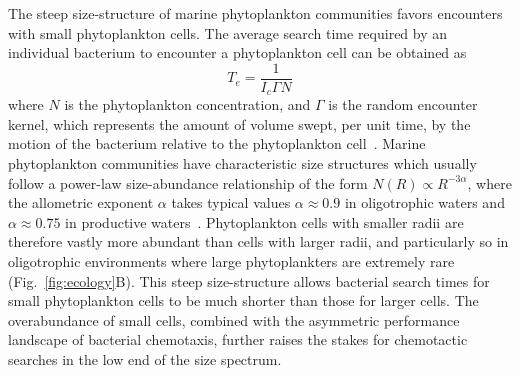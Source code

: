\documentclass[9pt,twocolumn,twoside]{pnas-new}
\begin{document}
The steep size-structure of marine phytoplankton communities favors encounters with small phytoplankton cells.
The average search time required by an individual bacterium to encounter a phytoplankton cell can be obtained as
\begin{equation}\label{eq:search_time}
    T_e = \dfrac{1}{I_c \Gamma N}
\end{equation}
where $N$ is the phytoplankton concentration, and $\Gamma$ is the random encounter kernel, which represents the amount of volume swept, per unit time, by the motion of the bacterium relative to the phytoplankton cell~\cite{kiorboe2008mechanistic,slomka2023encounter}.
Marine phytoplankton communities have characteristic size structures which usually follow a power-law size-abundance relationship of the form $N(R) \propto R^{-3\alpha}$, where the allometric exponent $\alpha$ takes typical values $\alpha\approx0.9$ in oligotrophic waters and $\alpha\approx0.75$ in productive waters~\cite{cermeno2008species}.
Phytoplankton cells with smaller radii are therefore vastly more abundant than cells with larger radii, and particularly so in oligotrophic environments where large phytoplankters are extremely rare (Fig.~\ref{fig:ecology}B).
This steep size-structure allows bacterial search times for small phytoplankton cells to be much shorter than those for larger cells.
The overabundance of small cells, combined with the asymmetric performance landscape of bacterial chemotaxis, further raises the stakes for chemotactic searches in the low end of the size spectrum.
\end{document}
